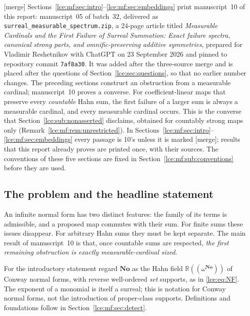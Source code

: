 \documentclass[11pt,letterpaper]{article}
\numberwithin{equation}{section}
\theoremstyle{definition}
\theoremstyle{remark}
\newcommand{\No}{\mathbf{No}}
\newcommand{\R}{\mathbb R}
\newcommand{\mergetag}{\textup{\textsf{\small[merge]}}}%
\newcommand{\fn}[1]{\nolinkurl{#1}}%
\newcommand{\HF}[2]{#1((\omega^{#2}))}
\begin{document}
\mergetag{} Sections~\ref{lce:mf:sec:intro}--\ref{lce:mf:sec:embeddings}
print manuscript~10 of this report: manuscript~05 of batch~32, delivered as
\fn{surreal_measurable_spectrum.zip}, a 24-page article titled
\emph{Measurable Cardinals and the First Failure of Surreal Summation: Exact
failure spectra, canonical strong parts, and omnific-preserving additive
symmetries}, prepared for Vladimir Reshetnikov with ChatGPT on 23 September
2026 and pinned to repository commit \texttt{7af8a30}. It was added after
the three-source merge and is placed after the questions of
Section~\ref{lce:sec:questions}, so that no earlier number changes. The
preceding sections construct an obstruction from a measurable cardinal;
manuscript~10 proves a converse. For coefficient-linear maps that preserve
every \emph{countable} Hahn sum, the first failure of a larger sum is always
a measurable cardinal, and every measurable cardinal occurs. This is the
converse that Section~\ref{lce:sub:nonasserted} disclaims, obtained for
countably strong maps only (Remark~\ref{lce:mf:rem:unrestricted}). In
Sections~\ref{lce:mf:sec:intro}--\ref{lce:mf:sec:embeddings} every passage
is 10's unless it is marked \mergetag; results that this report already
proves are printed once, with their sources. The conventions of these five
sections are fixed in Section~\ref{lce:mf:sub:conventions} before they are
used.

\subsection{The problem and the headline statement}
An infinite normal form has two distinct features: the family of its terms
is admissible, and a proposed map commutes with their sum. For finite sums
these issues disappear. For arbitrary Hahn sums they must be kept separate.
The main result of manuscript~10 is that, once countable sums are respected,
\emph{the first remaining obstruction is exactly measurable-cardinal sized}.

For the introductory statement regard $\No$ as the Hahn field
$\HF{\R}{\No}$ of Conway normal forms, with reverse well-ordered \emph{set}
supports, as in \eqref{lce:eq:NF}. The exponent of a monomial is itself a
surreal; this is notation for Conway normal forms, not the introduction of
proper-class supports. Definitions and foundations follow in
Section~\ref{lce:mf:sec:detect}.
\end{document}

